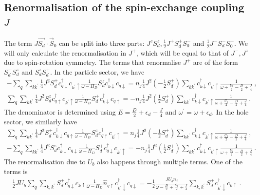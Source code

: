 \documentclass{iopart}
\begin{document}
\subsection{Renormalisation of the spin-exchange coupling \(J\)}
The term \(J \vec{S_d}\cdot\vec{S}_0\) can be split into three parts: \(J^z S_d^z, \frac{1}{2}J^+ S_d^+ S_0^-\) and \(\frac{1}{2}J^- S_d^- S_0^+\). We will only calculate the renormalisation in \(J^+\), which will be equal to that of \(J^-,J^z\) due to spin-rotation symmetry. The terms that renormalise \(J^+\) are of the form \(S_d^+ S_d^z\) and \(S_d^z S_d^+\). In the particle sector, we have
\begin{eqnarray}
	-\sum_{q} \sum_{kk^\prime}\frac{1}{4}J^2 S_d^+ c^\dagger_{q\downarrow}c_{k^\prime \uparrow} \frac{1}{\omega - H_D}S_d^z c^\dagger_{k \downarrow}c_{q \downarrow} = n_j \frac{1}{4}J^2 \left(-\frac{1}{2}S_d^+\right) \sum_{kk^\prime}c^\dagger_{k \downarrow}c_{k^\prime \uparrow} \frac{1}{\omega + \frac{U_b}{2} - \frac{D}{2} + \frac{J}{4}}~,\nonumber\\
	\sum_{q} \sum_{kk^\prime} \frac{1}{4}J^2 S_d^z c^\dagger_{q \uparrow}c_{k^\prime \uparrow} \frac{1}{\omega - H_D} S_d^+ c^\dagger_{k\downarrow}c_{q \uparrow} = -n_j \frac{1}{4}J^2 \left(\frac{1}{2}S_d^+\right) \sum_{kk^\prime}c^\dagger_{k \downarrow}c_{k^\prime \uparrow} \frac{1}{\omega + \frac{U_b}{2} - \frac{D}{2} + \frac{J}{4}}~.\qquad
\end{eqnarray}
The denominator is determined using \(E = \frac{D}{2} + \epsilon_d - \frac{J}{4}\) and \(\omega^\prime = \omega + \epsilon_d\).
In the hole sector, we similarly have
\begin{eqnarray}
	\sum_{q} \sum_{kk^\prime}\frac{1}{4}J^2 S_d^+ c^\dagger_{k\downarrow}c_{q \uparrow} \frac{1}{\omega - H_D}S_d^z c^\dagger_{q \uparrow}c_{k^\prime \uparrow} = n_j \frac{1}{4}J^2 \left(-\frac{1}{2}S_d^+\right) \sum_{kk^\prime}c^\dagger_{k \downarrow}c_{k^\prime \uparrow} \frac{1}{\omega + \frac{U_b}{2} - \frac{D}{2} + \frac{J}{4}}~,\nonumber\\
	-\sum_{q} \sum_{kk^\prime} \frac{1}{4}J^2 S_d^z c^\dagger_{k \downarrow}c_{q \downarrow} \frac{1}{\omega - H_D} S_d^+ c^\dagger_{q\downarrow}c_{k^\prime \uparrow} = -n_j \frac{1}{4}J^2 \left(\frac{1}{2}S_d^+\right) \sum_{kk^\prime}c^\dagger_{k \downarrow}c_{k^\prime \uparrow} \frac{1}{\omega + \frac{U_b}{2} - \frac{D}{2} + \frac{J}{4}}~.
\end{eqnarray}
The renormalisation due to \(U_b\) also happens through multiple terms. One of the terms is
\begin{eqnarray}
	\frac{1}{2} J U_b \sum_{q} \sum_{k,k^\prime} S_d^+ c^\dagger_{q \downarrow} c_{k \uparrow} \frac{1}{\omega - H_D} \hat n_{q \uparrow} c^\dagger_{k^\prime \downarrow}c_{q \downarrow} = -\frac{1}{2}\frac{J U_b n_j}{\omega - \frac{D}{2} + \frac{U_b}{2} + \frac{J}{4}} \sum_{k,k^\prime} S_d^+ c^\dagger_{k^\prime \downarrow} c_{k \uparrow}~.
\end{eqnarray}
\end{document}
